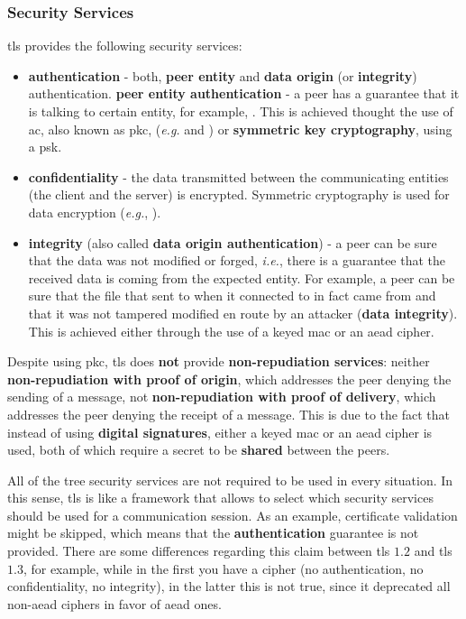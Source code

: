 \documentclass{llncs}
\begin{document}
\subsubsection{Security Services}
%
\gls{tls} provides the following security services:
\begin{itemize}
\item \textbf{authentication} - both, \textbf{peer entity} and \textbf{data origin} (or \textbf{integrity})
authentication.
\subitem \textbf{peer entity authentication} - a peer has a guarantee that it is talking to certain entity, for example, .
This is achieved thought the use of \gls{ac}, also known as \gls{pkc}, (\textit{e.g.}  and )
or \textbf{symmetric key cryptography}, using a \gls{psk}.
\item \textbf{confidentiality} - the data transmitted between the communicating
entities (the client and the server) is encrypted. Symmetric cryptography is
used for data encryption (\textit{e.g.}, ).
\item \textbf{integrity} (also called \textbf{data origin authentication}) - a peer can be sure that the data was not modified or forged,
\textit{i.e.}, there is a guarantee that the received data is coming from the expected entity. For example, a peer can be sure
that the  file that sent to when it connected to  in fact
came from  and that it was not tampered modified en
route by an attacker (\textbf{data integrity}). This is achieved either through the use
of a keyed \gls{mac} or an \gls{aead} cipher.
\end{itemize}

Despite using \gls{pkc}, \gls{tls} does \textbf{not} provide \textbf{non-repudiation services}:
neither \textbf{non-repudiation with proof of origin}, which addresses the peer denying
the sending of a message, not \textbf{non-repudiation with proof of delivery}, which
addresses the peer denying the receipt of a message. This is due to the fact that
instead of using \textbf{digital signatures}, either a keyed \gls{mac} or an \gls{aead}
cipher is used, both of which require a secret to be \textbf{shared} between the peers.

All of the tree security services are not required to be used in every situation.
In this sense, \gls{tls} is like a framework that allows to select which security services should be used for a communication session. As an example,
certificate validation might be skipped, which means that the \textbf{authentication} guarantee is not provided. There are some differences regarding this claim between \gls{tls} $1.2$
and \gls{tls} $1.3$, for example, while in the first you have a 
cipher (no authentication, no confidentiality, no integrity), in the latter
this is not true, since it deprecated all non-\gls{aead} ciphers in favor of
\gls{aead} ones.
\end{document}
